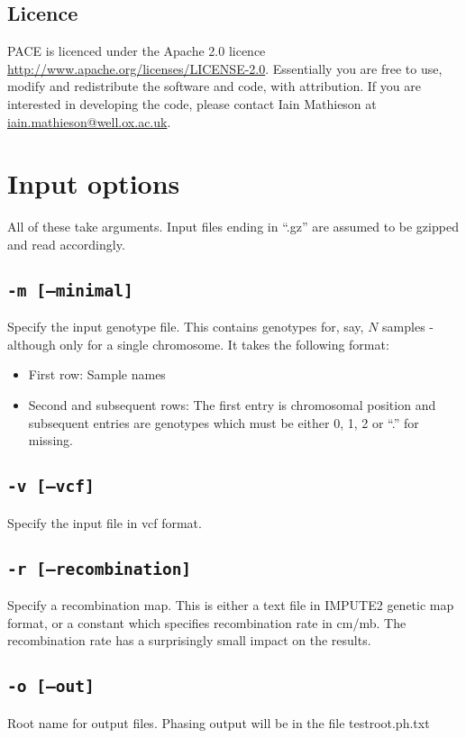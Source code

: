 \documentclass[10pt]{refart}
\begin{document}
\subsection{Licence}
PACE is licenced under the Apache 2.0 licence \url{http://www.apache.org/licenses/LICENSE-2.0}. Essentially you are free to use, modify and redistribute the software and code, with attribution. If you are interested in developing the code, please contact Iain Mathieson at \href{mailto:iain.mathieson@well.ox.ac.uk}{iain.mathieson@well.ox.ac.uk}.

\newpage

\section{Input options}
All of these take arguments. Input files ending in ``.gz'' are assumed to be gzipped and read accordingly. 
\subsection{\texttt{-m [--minimal]}}
Specify the input genotype file. This contains genotypes for, say, $N$ samples - although only for a single chromosome. It takes the following format: 
\begin{itemize}
\item
First row: Sample names
\item
Second and subsequent rows: The first entry is chromosomal position
and subsequent entries are genotypes which must be either 0, 1, 2 or
``.'' for missing. 
\end{itemize}

\subsection{\texttt{-v [--vcf]}}
Specify the input file in vcf format.  

\subsection{\texttt{-r [--recombination]}}
Specify a recombination map. This is either a text file in IMPUTE2
genetic map format, or a constant which specifies recombination rate
in cm/mb. The recombination rate has a surprisingly small impact on
the results.

\subsection{\texttt{-o [--out]}}
Root name for output files. Phasing output will be in the file {testroot}.ph.txt
\end{document}

